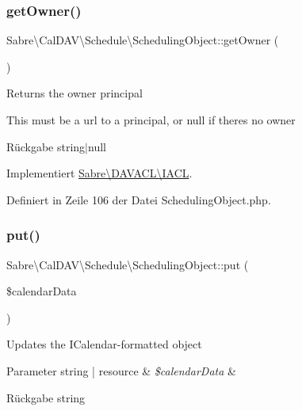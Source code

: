 \subsubsection{\texorpdfstring{get\+Owner()}{getOwner()}}
{\footnotesize\ttfamily Sabre\textbackslash{}\+Cal\+D\+A\+V\textbackslash{}\+Schedule\textbackslash{}\+Scheduling\+Object\+::get\+Owner (\begin{DoxyParamCaption}{ }\end{DoxyParamCaption})}

Returns the owner principal

This must be a url to a principal, or null if there\textquotesingle{}s no owner

\begin{DoxyReturn}{Rückgabe}
string$\vert$null 
\end{DoxyReturn}


Implementiert \mbox{\hyperlink{interface_sabre_1_1_d_a_v_a_c_l_1_1_i_a_c_l_a05f531b4ae1a86eab4e6e95b0413390e}{Sabre\textbackslash{}\+D\+A\+V\+A\+C\+L\textbackslash{}\+I\+A\+CL}}.



Definiert in Zeile 106 der Datei Scheduling\+Object.\+php.

\mbox{\label{class_sabre_1_1_cal_d_a_v_1_1_schedule_1_1_scheduling_object_ad133bc9b14a66ff31e11041cb1013e51}} 
\subsubsection{\texorpdfstring{put()}{put()}}
{\footnotesize\ttfamily Sabre\textbackslash{}\+Cal\+D\+A\+V\textbackslash{}\+Schedule\textbackslash{}\+Scheduling\+Object\+::put (\begin{DoxyParamCaption}\item[{}]{\$calendar\+Data }\end{DoxyParamCaption})}

Updates the I\+Calendar-\/formatted object


\begin{DoxyParams}[1]{Parameter}
string | resource & {\em \$calendar\+Data} & \\
\hline
\end{DoxyParams}
\begin{DoxyReturn}{Rückgabe}
string 
\end{DoxyReturn}


